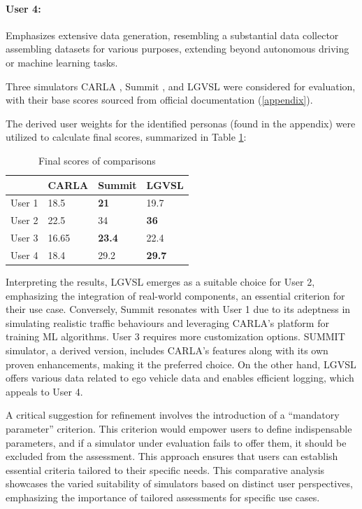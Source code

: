 \documentclass[12pt,twoside,a4paper,parskip]{scrbook} %
\begin{document}
\paragraph*{User 4: } Emphasizes extensive data generation, resembling a substantial data collector assembling datasets for various purposes, extending beyond autonomous driving or machine learning tasks.

Three simulators CARLA \cite{Carla}, Summit \cite{SUMMIT}, and LGVSL \cite{lgsvl} were considered for evaluation, with their base scores sourced from official documentation (\ref{appendix}).

The derived user weights for the identified personas (found in the appendix) were utilized to calculate final scores, summarized in Table \ref{tab:score}:
\begin{table}[H]
\centering
\renewcommand{\arraystretch}{1.5} %
\begin{tabular}{|p{2.5cm}|p{2.5cm}|p{2.5cm}|p{2.5cm}|} %
\hline
       & CARLA & Summit & LGVSL \\
\hline
User 1 & 18.5  & \textbf{21}     & 19.7  \\
User 2 & 22.5  & 34     & \textbf{36}    \\
User 3 & 16.65 &\textbf{23.4}    &22.4 \\
User 4 & 18.4  &29.2    &\textbf{29.7}\\
\hline
\end{tabular}
\caption{Final scores of comparisons}
\label{tab:score}
\end{table}


Interpreting the results, LGVSL emerges as a suitable choice for User 2, emphasizing the integration of real-world components, an essential criterion for their use case. Conversely, Summit resonates with User 1 due to its adeptness in simulating realistic traffic behaviours and leveraging CARLA's platform for training ML algorithms. User 3 requires more customization options. SUMMIT simulator, a derived version, includes CARLA's features along with its own proven enhancements, making it the preferred choice. On the other hand, LGVSL offers various data related to ego vehicle data and enables efficient logging, which appeals to User 4.

A critical suggestion for refinement involves the introduction of a “mandatory parameter” criterion. This criterion would empower users to define indispensable parameters, and if a simulator under evaluation fails to offer them, it should be excluded from the assessment. This approach ensures that users can establish essential criteria tailored to their specific needs.
This comparative analysis showcases the varied suitability of simulators based on distinct user perspectives, emphasizing the importance of tailored assessments for specific use cases.
\end{document}
